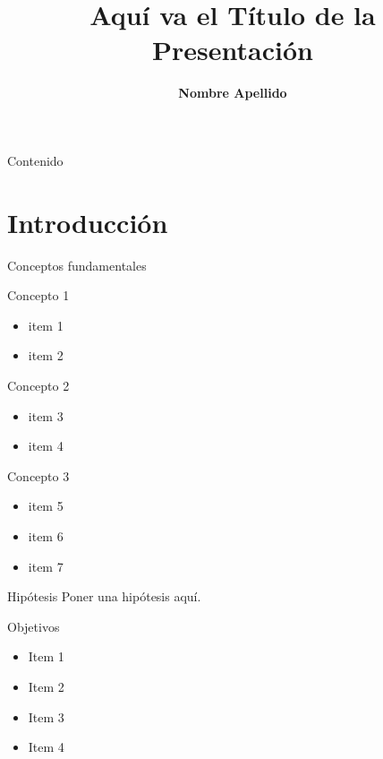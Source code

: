 \documentclass[9pt]{beamer}
\title{Aquí va el Título de la Presentación}
\author{{\bf Nombre Apellido}}
\begin{document}
\frame
	\titlepage
	


\begin{frame}{Contenido}
	\tableofcontents
\end{frame}


\section{Introducción}

	\begin{frame}{Conceptos fundamentales}

		\begin{block}{Concepto 1}
			\begin{itemize}
				\item item 1 \citet{arias2006}
				\item item 2
			\end{itemize}
		\end{block}
	
		\begin{block}{Concepto 2}
			\begin{itemize}
				\item item 3 \citet{arias2006}
				\item item 4
			\end{itemize}
		\end{block}

		\begin{block}{Concepto 3}
			\begin{itemize}
				\item item 5 
				\item item 6
				\item item 7
			\end{itemize}
		\end{block}
	
	\end{frame}


	\begin{frame}{Hipótesis}
		Poner una hipótesis aquí.
	\end{frame}

	\begin{frame}{Objetivos}
	\begin{itemize}
		\item Item 1
		\item Item 2
		\item Item 3
		\item Item 4
	\end{itemize}
	\end{frame}
\end{document}
